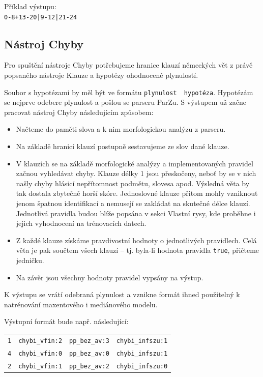 \documentclass[12pt,a4paper]{report}
\begin{document}
Příklad výstupu:\\
\texttt{0-8+13-20|9-12|21-24}


\subsection{Nástroj Chyby}

Pro spuštění nástroje Chyby potřebujeme hranice klauzí německých vět z právě popsaného nástroje Klauze a hypotézy ohodnocené plynulostí.

Soubor s hypotézami by měl být ve formátu \texttt{plynulost \textbar ~hypotéza}. Hypotézám se nejprve odebere plynulost a pošlou se parseru ParZu. S výstupem už začne pracovat nástroj Chyby následujícím způsobem:

\begin{itemize}
\item{Načteme do paměti slova a k nim morfologickou analýzu z parseru.}
\item{Na základě hranicí klauzí postupně sestavujeme ze slov dané klauze.}
\item{V klauzích se na základě morfologické analýzy a implementovaných pravidel začnou vyhledávat chyby. Klauze délky 1 jsou přeskočeny, neboť by se v nich našly chyby hlásicí nepřítomnost podmětu, slovesa apod. Výsledná věta by tak dostala zbytečně horší skóre. Jednoslovné klauze přitom mohly vzniknout jenom špatnou identifikací a nemusejí se zakládat na skutečné délce klauzí. Jednotlivá pravidla budou blíže popsána v sekci Vlastní rysy, kde proběhne i jejich vyhodnocení na trénovacích datech.}
\item{Z každé klauze získáme pravdivostní hodnoty o jednotlivých pravidlech. Celá věta je pak součtem všech klauzí -- tj. byla-li hodnota pravidla \texttt{true}, přičteme jedničku.}
\item{Na závěr jsou všechny hodnoty pravidel vypsány na výstup.}
\end{itemize}

K výstupu se vrátí odebraná plynulost a vznikne formát ihned použitelný k natrénování maxentového i mediánového modelu.

Výstupní formát bude např. následující:

\begin{center}
\begin{tabular}{llll}
\hline
\texttt{1} & \texttt{chybi\_vfin:2} & \texttt{pp\_bez\_av:3} & \texttt{chybi\_infszu:1} \\
\texttt{4} & \texttt{chybi\_vfin:0} & \texttt{pp\_bez\_av:0} & \texttt{chybi\_infszu:1} \\
\texttt{2} & \texttt{chybi\_vfin:1} & \texttt{pp\_bez\_av:2} & \texttt{chybi\_infszu:0} \\
\hline
\end{tabular}
\end{center}
\end{document}
